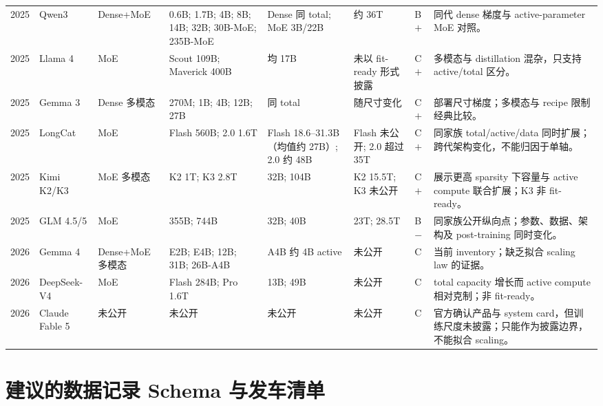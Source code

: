 \documentclass[UTF8,10pt,a4paper,fontset=none]{ctexart}
\begin{document}
\begin{longtable}{C{0.55cm}p{1.50cm}p{1.10cm}p{3.20cm}p{2.00cm}p{1.80cm}C{0.65cm}p{3.80cm}}
2025 & Qwen3\cite{zh:qwen3} & Dense+\allowbreak MoE & 0.6B; 1.7B; 4B; 8B; 14B; 32B; 30B-MoE; 235B-MoE & Dense 同 total; MoE 3B/22B & 约 36T & B$+$ & 同代 dense 梯度与 active-parameter MoE 对照。 \\
2025 & Llama 4\cite{zh:llama4} & MoE & Scout 109B; Maverick 400B & 均 17B & 未以 fit-ready 形式披露 & C$+$ & 多模态与 distillation 混杂，只支持 active/total 区分。 \\
2025 & Gemma 3\cite{zh:gemma3} & Dense 多模态 & 270M; 1B; 4B; 12B; 27B & 同 total & 随尺寸变化 & C$+$ & 部署尺寸梯度；多模态与 recipe 限制经典比较。 \\
2025 & LongCat\cite{zh:longcatflash,zh:longcat2} & MoE & Flash 560B; 2.0 1.6T & Flash 18.6--31.3B（均值约 27B）; 2.0 约 48B & Flash 未公开; 2.0 超过 35T & C$+$ & 同家族 total/active/data 同时扩展；跨代架构变化，不能归因于单轴。 \\
2025 & Kimi K2/K3\cite{zh:kimik2,zh:kimik3} & MoE 多模态 & K2 1T; K3 2.8T & 32B; 104B & K2 15.5T; K3 未公开 & C$+$ & 展示更高 sparsity 下容量与 active compute 联合扩展；K3 非 fit-ready。 \\
2025 & GLM 4.5/5\cite{zh:glm5} & MoE & 355B; 744B & 32B; 40B & 23T; 28.5T & B$-$ & 同家族公开纵向点；参数、数据、架构及 post-training 同时变化。 \\
2026 & Gemma 4\cite{zh:gemma4} & Dense+\allowbreak MoE 多模态 & E2B; E4B; 12B; 31B; 26B-A4B & A4B 约 4B active & 未公开 & C & 当前 inventory；缺乏拟合 scaling law 的证据。 \\
2026 & DeepSeek-V4\cite{zh:deepseekv4} & MoE & Flash 284B; Pro 1.6T & 13B; 49B & 未公开 & C & total capacity 增长而 active compute 相对克制；非 fit-ready。 \\
2026 & Claude Fable 5\cite{zh:claudefable5} & 未公开 & 未公开 & 未公开 & 未公开 & C & 官方确认产品与 system card，但训练尺度未披露；只能作为披露边界，不能拟合 scaling。 \\
\end{longtable}

\clearpage
\section{建议的数据记录 Schema 与发车清单}
\label{zh:app:schema}
\end{document}
